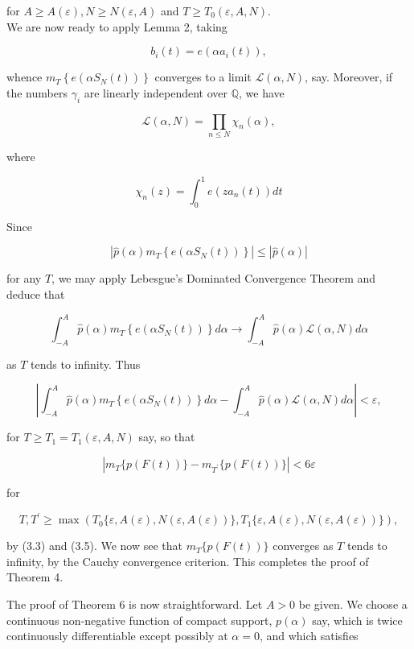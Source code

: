 \documentclass[10pt]{article}
\begin{document}
for $A \geq A(\varepsilon), N \geq N(\varepsilon, A)$ and $T \geq T_{0}(\varepsilon, A, N)$.\\
We are now ready to apply Lemma 2, taking

$$
b_{i}(t)=e\left(\alpha a_{i}(t)\right),
$$

whence $m_{T}\left\{e\left(\alpha S_{N}(t)\right)\right\}$ converges to a limit $\mathcal{L}(\alpha, N)$, say. Moreover, if the numbers $\gamma_{i}$ are linearly independent over $\mathbb{Q}$, we have

$$
\mathcal{L}(\alpha, N)=\prod_{n \leq N} \chi_{n}(\alpha),
$$

where


\begin{equation*}
\chi_{n}(z)=\int_{0}^{1} e\left(z a_{n}(t)\right) d t \tag{3.4}
\end{equation*}


Since

$$
\left|\widehat{p}(\alpha) m_{T}\left\{e\left(\alpha S_{N}(t)\right)\right\}\right| \leq|\widehat{p}(\alpha)|
$$

for any $T$, we may apply Lebesgue's Dominated Convergence Theorem and deduce that

$$
\int_{-A}^{A} \widehat{p}(\alpha) m_{T}\left\{e\left(\alpha S_{N}(t)\right)\right\} d \alpha \rightarrow \int_{-A}^{A} \widehat{p}(\alpha) \mathcal{L}(\alpha, N) d \alpha
$$

as $T$ tends to infinity. Thus


\begin{equation*}
\left|\int_{-A}^{A} \widehat{p}(\alpha) m_{T}\left\{e\left(\alpha S_{N}(t)\right)\right\} d \alpha-\int_{-A}^{A} \widehat{p}(\alpha) \mathcal{L}(\alpha, N) d \alpha\right|<\varepsilon, \tag{3.5}
\end{equation*}


for $T \geq T_{1}=T_{1}(\varepsilon, A, N)$ say, so that

$$
\left|m_{T}\{p(F(t))\}-m_{T^{\prime}}\{p(F(t))\}\right|<6 \varepsilon
$$

for

$$
T, T^{\prime} \geq \max \left(T_{0}\{\varepsilon, A(\varepsilon), N(\varepsilon, A(\varepsilon))\}, T_{1}\{\varepsilon, A(\varepsilon), N(\varepsilon, A(\varepsilon))\}\right),
$$

by (3.3) and (3.5). We now see that $m_{T}\{p(F(t))\}$ converges as $T$ tends to infinity, by the Cauchy convergence criterion. This completes the proof of Theorem 4.

The proof of Theorem 6 is now straightforward. Let $A>0$ be given. We choose a continuous non-negative function of compact support, $p(\alpha)$ say, which is twice continuously differentiable except possibly at $\alpha=0$, and which satisfies
\end{document}
